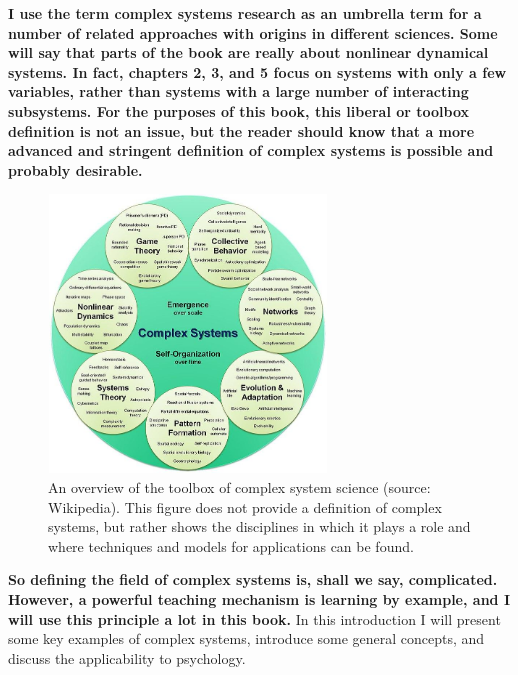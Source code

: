 \documentclass[
  letterpaper,
]{scrbook}
\begin{document}
\textbf{I use the term complex systems research as an umbrella term for
a number of related approaches with origins in different sciences. Some
will say that parts of the book are really about nonlinear dynamical
systems. In fact, chapters 2, 3, and 5 focus on systems with only a few
variables, rather than systems with a large number of interacting
subsystems. For the purposes of this book, this liberal or toolbox
definition is not an issue, but the reader should know that a more
advanced and stringent definition of complex systems is possible and
probably desirable.}

\begin{figure}

{\centering \includegraphics[width=2.91875in,height=2.90694in]{media/ch1/image3.jpg}

}

\caption{\label{fig-ch1-img3}An overview of the toolbox of complex
system science (source: Wikipedia). This figure does not provide a
definition of complex systems, but rather shows the disciplines in which
it plays a role and where techniques and models for applications can be
found.}

\end{figure}

\textbf{So defining the field of complex systems is, shall we say,
complicated. However, a powerful teaching mechanism is learning by
example, and I will use this principle a lot in this book.} In this
introduction I will present some key examples of complex systems,
introduce some general concepts, and discuss the applicability to
psychology.
\end{document}

